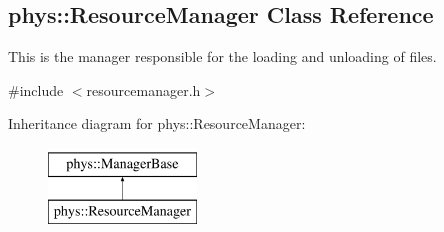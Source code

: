\hypertarget{classphys_1_1ResourceManager}{
\subsection{phys::ResourceManager Class Reference}
\label{classphys_1_1ResourceManager}
}


This is the manager responsible for the loading and unloading of files.  




{\ttfamily \#include $<$resourcemanager.h$>$}

Inheritance diagram for phys::ResourceManager:\begin{figure}[H]
\begin{center}
\leavevmode
\includegraphics[height=2.000000cm]{classphys_1_1ResourceManager}
\end{center}
\end{figure}
